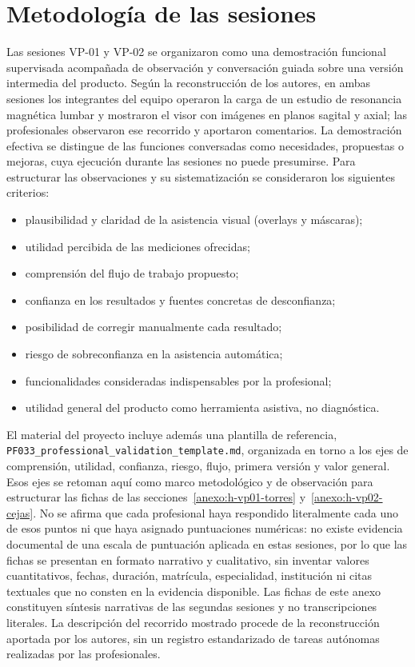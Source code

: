 \section{Metodología de las sesiones}
\label{anexo:h-metodologia}

Las sesiones VP-01 y VP-02 se organizaron como una demostración funcional supervisada acompañada de observación y conversación guiada sobre una versión intermedia del producto. Según la reconstrucción de los autores, en ambas sesiones los integrantes del equipo operaron la carga de un estudio de resonancia magnética lumbar y mostraron el visor con imágenes en planos sagital y axial; las profesionales observaron ese recorrido y aportaron comentarios. La demostración efectiva se distingue de las funciones conversadas como necesidades, propuestas o mejoras, cuya ejecución durante las sesiones no puede presumirse. Para estructurar las observaciones y su sistematización se consideraron los siguientes criterios:

\begin{itemize}
    \item plausibilidad y claridad de la asistencia visual (overlays y máscaras);
    \item utilidad percibida de las mediciones ofrecidas;
    \item comprensión del flujo de trabajo propuesto;
    \item confianza en los resultados y fuentes concretas de desconfianza;
    \item posibilidad de corregir manualmente cada resultado;
    \item riesgo de sobreconfianza en la asistencia automática;
    \item funcionalidades consideradas indispensables por la profesional;
    \item utilidad general del producto como herramienta asistiva, no diagnóstica.
\end{itemize}

El material del proyecto incluye además una plantilla de referencia, \texttt{PF033\_professional\_\allowbreak validation\_\allowbreak template.md}, organizada en torno a los ejes de comprensión, utilidad, confianza, riesgo, flujo, primera versión y valor general. Esos ejes se retoman aquí como marco metodológico y de observación para estructurar las fichas de las secciones~\ref{anexo:h-vp01-torres} y~\ref{anexo:h-vp02-cejas}. No se afirma que cada profesional haya respondido literalmente cada uno de esos puntos ni que haya asignado puntuaciones numéricas: no existe evidencia documental de una escala de puntuación aplicada en estas sesiones, por lo que las fichas se presentan en formato narrativo y cualitativo, sin inventar valores cuantitativos, fechas, duración, matrícula, especialidad, institución ni citas textuales que no consten en la evidencia disponible. Las fichas de este anexo constituyen síntesis narrativas de las segundas sesiones y no transcripciones literales. La descripción del recorrido mostrado procede de la reconstrucción aportada por los autores, sin un registro estandarizado de tareas autónomas realizadas por las profesionales.

